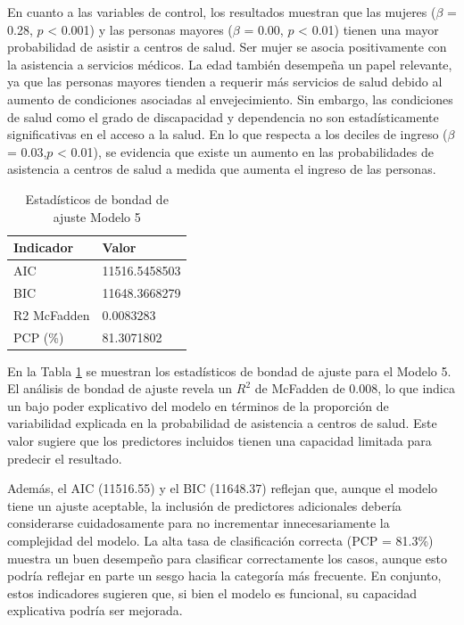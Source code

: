 \documentclass[
  12pt,
  a4paper,
]{article}
\begin{document}
En cuanto a las variables de control, los resultados muestran que las mujeres (\(\beta\) = 0.28, \(p\) \textless{} 0.001) y las personas mayores (\(\beta\) = 0.00, \(p\) \textless{} 0.01) tienen una mayor probabilidad de asistir a centros de salud. Ser mujer se asocia positivamente con la asistencia a servicios médicos. La edad también desempeña un papel relevante, ya que las personas mayores tienden a requerir más servicios de salud debido al aumento de condiciones asociadas al envejecimiento. Sin embargo, las condiciones de salud como el grado de discapacidad y dependencia no son estadísticamente significativas en el acceso a la salud. En lo que respecta a los deciles de ingreso (\(\beta\) = 0.03,\(p\) \textless{} 0.01), se evidencia que existe un aumento en las probabilidades de asistencia a centros de salud a medida que aumenta el ingreso de las personas.

\begin{table}[!h]

\caption{\label{tab:table3}\label{tab:table3} Estadísticos de bondad de ajuste Modelo 5}
\centering
\begin{tabular}[t]{>{\raggedright\arraybackslash}p{8cm}l}
\toprule
\textbf{Indicador} & \textbf{Valor}\\
\midrule
AIC & 11516.5458503\\
BIC & 11648.3668279\\
R2 McFadden & 0.0083283\\
PCP (\%) & 81.3071802\\
\bottomrule
\end{tabular}
\end{table}

En la Tabla \ref{tab:table3} se muestran los estadísticos de bondad de ajuste para el Modelo 5. El análisis de bondad de ajuste revela un \(R^2\) de McFadden de 0.008, lo que indica un bajo poder explicativo del modelo en términos de la proporción de variabilidad explicada en la probabilidad de asistencia a centros de salud. Este valor sugiere que los predictores incluidos tienen una capacidad limitada para predecir el resultado.

Además, el AIC (11516.55) y el BIC (11648.37) reflejan que, aunque el modelo tiene un ajuste aceptable, la inclusión de predictores adicionales debería considerarse cuidadosamente para no incrementar innecesariamente la complejidad del modelo. La alta tasa de clasificación correcta (PCP = 81.3\%) muestra un buen desempeño para clasificar correctamente los casos, aunque esto podría reflejar en parte un sesgo hacia la categoría más frecuente. En conjunto, estos indicadores sugieren que, si bien el modelo es funcional, su capacidad explicativa podría ser mejorada.
\end{document}
